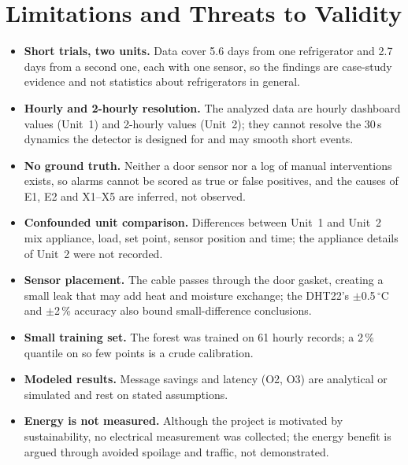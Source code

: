 \documentclass[conference]{IEEEtran}
\newcommand{\degC}{\ensuremath{^{\circ}}C}
\begin{document}
\section{Limitations and Threats to Validity}
\begin{itemize}
\item \textbf{Short trials, two units.} Data cover 5.6 days from one refrigerator and 2.7 days from a second one, each with one sensor, so the findings are case-study evidence and not statistics about refrigerators in general.
\item \textbf{Hourly and 2-hourly resolution.} The analyzed data are hourly dashboard values (Unit~1) and 2-hourly values (Unit~2); they cannot resolve the 30\,s dynamics the detector is designed for and may smooth short events.
\item \textbf{No ground truth.} Neither a door sensor nor a log of manual interventions exists, so alarms cannot be scored as true or false positives, and the causes of E1, E2 and X1--X5 are inferred, not observed.
\item \textbf{Confounded unit comparison.} Differences between Unit~1 and Unit~2 mix appliance, load, set point, sensor position and time; the appliance details of Unit~2 were not recorded.
\item \textbf{Sensor placement.} The cable passes through the door gasket, creating a small leak that may add heat and moisture exchange; the DHT22's $\pm$0.5\,\degC{} and $\pm$2\,\% accuracy also bound small-difference conclusions.
\item \textbf{Small training set.} The forest was trained on 61 hourly records; a 2\,\% quantile on so few points is a crude calibration.
\item \textbf{Modeled results.} Message savings and latency (O2, O3) are analytical or simulated and rest on stated assumptions.
\item \textbf{Energy is not measured.} Although the project is motivated by sustainability, no electrical measurement was collected; the energy benefit is argued through avoided spoilage and traffic, not demonstrated.
\end{itemize}

\end{document}

